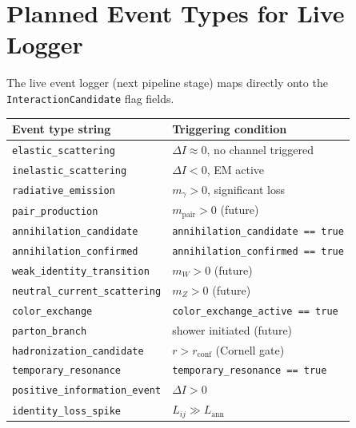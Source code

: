 \documentclass[11pt,a4paper]{article}
\theoremstyle{defbox}
\begin{document}
\section{Planned Event Types for Live Logger}
\label{sec:events}

The live event logger (next pipeline stage) maps directly onto the
\texttt{InteractionCandidate} flag fields.

\begin{center}
\renewcommand{\arraystretch}{1.25}
\begin{tabular}{ll}
\toprule
\textbf{Event type string} & \textbf{Triggering condition} \\
\midrule
\texttt{elastic\_scattering}          & $\Delta I \approx 0$, no channel triggered \\
\texttt{inelastic\_scattering}        & $\Delta I < 0$, EM active \\
\texttt{radiative\_emission}          & $m_\gamma > 0$, significant loss \\
\texttt{pair\_production}             & $m_{\mathrm{pair}} > 0$ (future) \\
\texttt{annihilation\_candidate}      & \texttt{annihilation\_candidate == true} \\
\texttt{annihilation\_confirmed}      & \texttt{annihilation\_confirmed == true} \\
\texttt{weak\_identity\_transition}   & $m_W > 0$ (future) \\
\texttt{neutral\_current\_scattering} & $m_Z > 0$ (future) \\
\texttt{color\_exchange}              & \texttt{color\_exchange\_active == true} \\
\texttt{parton\_branch}               & shower initiated (future) \\
\texttt{hadronization\_candidate}     & $r > r_{\mathrm{conf}}$ (Cornell gate) \\
\texttt{temporary\_resonance}         & \texttt{temporary\_resonance == true} \\
\texttt{positive\_information\_event} & $\Delta I > 0$ \\
\texttt{identity\_loss\_spike}        & $L_{ij} \gg L_{\mathrm{ann}}$ \\
\bottomrule
\end{tabular}
\end{center}
\end{document}
